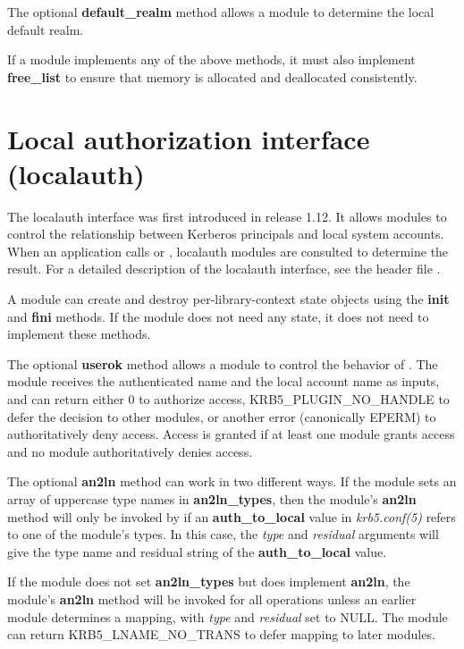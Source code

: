 \documentclass[letterpaper,10pt,english]{sphinxmanual}
\begin{document}
The optional \textbf{default\_realm} method allows a module to determine the
local default realm.

If a module implements any of the above methods, it must also
implement \textbf{free\_list} to ensure that memory is allocated and
deallocated consistently.


\section{Local authorization interface (localauth)}
\label{plugindev/localauth:local-authorization-interface-localauth}\label{plugindev/localauth:localauth-plugin}\label{plugindev/localauth::doc}
The localauth interface was first introduced in release 1.12.  It
allows modules to control the relationship between Kerberos principals
and local system accounts.  When an application calls
 or , localauth
modules are consulted to determine the result.  For a detailed
description of the localauth interface, see the header file
.

A module can create and destroy per-library-context state objects
using the \textbf{init} and \textbf{fini} methods.  If the module does not need
any state, it does not need to implement these methods.

The optional \textbf{userok} method allows a module to control the behavior
of .  The module receives the authenticated name
and the local account name as inputs, and can return either 0 to
authorize access, KRB5\_PLUGIN\_NO\_HANDLE to defer the decision to other
modules, or another error (canonically EPERM) to authoritatively deny
access.  Access is granted if at least one module grants access and no
module authoritatively denies access.

The optional \textbf{an2ln} method can work in two different ways.  If the
module sets an array of uppercase type names in \textbf{an2ln\_types}, then
the module's \textbf{an2ln} method will only be invoked by
 if an \textbf{auth\_to\_local} value in
\emph{krb5.conf(5)} refers to one of the module's types.  In this
case, the \emph{type} and \emph{residual} arguments will give the type name and
residual string of the \textbf{auth\_to\_local} value.

If the module does not set \textbf{an2ln\_types} but does implement
\textbf{an2ln}, the module's \textbf{an2ln} method will be invoked for all
 operations unless an earlier module
determines a mapping, with \emph{type} and \emph{residual} set to NULL.  The
module can return KRB5\_LNAME\_NO\_TRANS to defer mapping to later
modules.
\end{document}
